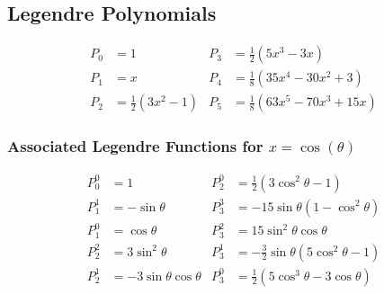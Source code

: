 \subsection{Legendre Polynomials}
\begin{footnotesize}
    \noindent\begin{align*}
        P_{0} & =1                     & P_{3} & =\frac{1}{2}(5x^{3}-3x)           \\
        P_{1} & =x                     & P_{4} & =\frac{1}{8}(35x^{4}-30x^{2}+3)   \\
        P_{2} & =\frac{1}{2}(3x^{2}-1) & P_{5} & =\frac{1}{8}(63x^{5}-70x^{3}+15x)
    \end{align*}
\end{footnotesize}

\subsubsection[Associated Legendre Functions]{Associated Legendre Functions for $x=\cos(\theta)$}
\begin{footnotesize}
    \noindent\begin{align*}
        P_{0}^{0} & =1                       & P_{2}^{0} & =\frac{1}{2}(3 \cos^{2}\theta-1)             \\
        P_{1}^{1} & =-\sin\theta             & P_{3}^{3} & =-15 \sin\theta(1-\cos^{2}\theta)            \\
        P_{1}^{0} & =\cos\theta              & P_{3}^{2} & =15 \sin^{2}\theta \cos\theta                \\
        P_{2}^{2} & =3 \sin^{2}\theta        & P_{3}^{1} & =-\frac{3}{2}\sin\theta (5 \cos^{2}\theta-1) \\
        P_{2}^{1} & =-3 \sin\theta\cos\theta & P_{3}^{0} & =\frac{1}{2} (5 \cos^{3}\theta-3 \cos\theta)
    \end{align*}
\end{footnotesize}